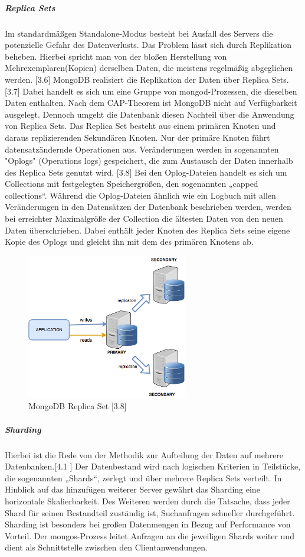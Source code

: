 \subparagraph{Replica Sets}
Im standardmäßgen Standalone-Modus besteht bei Ausfall des Servers die potenzielle Gefahr des Datenverlusts. Das Problem lässt sich durch Replikation beheben. Hierbei spricht man von der bloßen Herstellung von Mehrexemplaren(Kopien) derselben Daten, die meistens regelmäßig abgeglichen werden. [3.6] MongoDB realisiert die Replikation der Daten über Replica Sets. [3.7] Dabei handelt es sich um eine Gruppe von mongod-Prozessen, die dieselben Daten enthalten. Nach dem CAP-Theorem ist MongoDB nicht auf Verfügbarkeit ausgelegt. Dennoch umgeht die Datenbank diesen Nachteil über die Anwendung von Replica Sets. Das Replica Set besteht aus einem primären Knoten und daraus replizierenden Sekundären Knoten. 
Nur der primäre Knoten führt datensatzändernde Operationen aus. Veränderungen werden in sogenannten "Oplogs" (Operations logs) gespeichert, die zum Austausch der Daten innerhalb des Replica Sets genutzt wird. [3.8]  Bei den Oplog-Dateien handelt es sich um Collections mit festgelegten Speichergrößen, den sogenannten „capped collections“. Während die Oplog-Dateien ähnlich wie ein Logbuch mit allen Veränderungen in den Datensätzen der Datenbank beschrieben werden, werden bei erreichter Maximalgröße der Collection die ältesten Daten von den neuen Daten überschrieben. Dabei enthält jeder Knoten des Replica Sets seine eigene Kopie des Oplogs und gleicht ihn mit dem des primären Knotens ab.

\begin{figure}[htb]
\centering
\includegraphics[width=7cm]{images/replicaset1.png}
\caption{MongoDB Replica Set [3.8]}
\end{figure}



\subparagraph{Sharding}
Hierbei ist die Rede von der Methodik zur Aufteilung der Daten auf mehrere Datenbanken.[4.1 ]
Der Datenbestand wird nach logischen Kriterien in  Teilstücke, die sogenannten „Shards“, zerlegt und über mehrere Replica Sets verteilt.
In Hinblick auf das hinzufügen weiterer Server gewährt das Sharding eine horizontale Skalierbarkeit.
Des Weiteren werden durch die Tatsache, dass jeder Shard für seinen Bestandteil zuständig ist,  Suchanfragen schneller durchgeführt. 
Sharding ist besonders bei großen Datenmengen in Bezug auf Performance von Vorteil.
Der mongos-Prozess leitet Anfragen an die jeweiligen Shards weiter und dient als Schnittstelle zwischen den Clientanwendungen.

